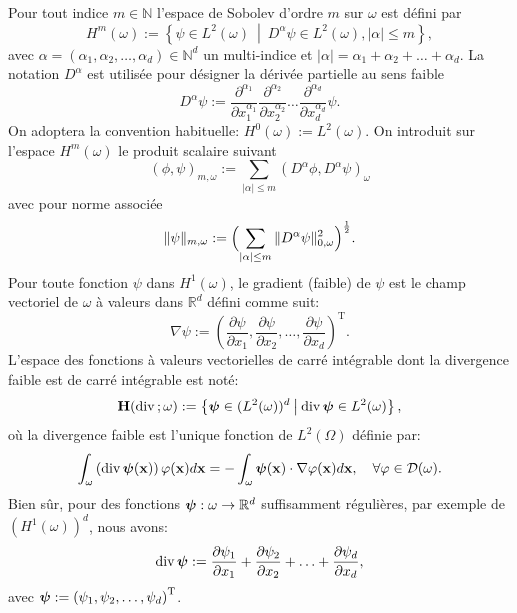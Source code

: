 \documentclass[11pt]{book}
\def\x{{\bf x}}
\def\H{{\bf H}}
\newcommand{\caD}{{\cal D}}
\newcommand{\R}{\mathbb{R}}
\newcommand{\N}{\mathbb{N}}
\newcommand{\bpsi}{\mbox{\boldmath{$\psi$}}}
\renewcommand{\div} {{\rm{div} \,}}
\begin{document}
\medskip

Pour tout indice $m \in \N$ l'espace de Sobolev d'ordre $m$ sur $\omega$ est défini par
\[ 
H^{m}(\omega) :=
\left \{ \psi \in L^2(\omega) \:\middle|\: D^\alpha \psi \in  L^2(\omega), \vert \alpha \vert \le m \right \},
\]
avec $\alpha=(\alpha_1,\alpha_2,\ldots,\alpha_d) \in \N^d$ un multi-indice et $\vert \alpha  \vert = \alpha_1 + \alpha_2 + \ldots + \alpha_d$.
La notation $D^\alpha $ est utilisée pour désigner la dérivée partielle au sens faible
\[
D^\alpha \psi := \frac{\partial^{\alpha_1}}{\partial x_1^{\alpha_1}} \frac{\partial^{\alpha_2}}{\partial x_2^{\alpha_2}} \ldots \frac{\partial^{\alpha_d}}{\partial x_d^{\alpha_d}} \psi.  
\]
On adoptera la convention habituelle: $H^0({\omega}):=L^2({\omega})$.
On introduit sur l'espace $H^{m}(\omega)$ le produit scalaire suivant
\[
(\phi , \psi )_{m,{\omega}} := \sum_{ \vert\alpha\vert \le m} ( D^\alpha \phi , D^\alpha \psi )_\omega
\]
avec pour norme associée
$$ \Vert \psi\Vert_{m,{\omega}} := \Bigl(\sum_{ \vert\alpha\vert\le m} \Vert D^\alpha \psi \Vert_{0,\omega}^2\Bigr)^{\frac12}.
$$
Pour toute fonction $\psi$ dans $H^1(\omega)$, le gradient (faible) de $\psi$ est le champ vectoriel de $\omega$ à valeurs dans $\R^d$ défini comme suit:
\[
\nabla \psi := \left ( \frac{\partial \psi}{\partial x_1} , \frac{\partial \psi}{\partial x_2} ,
\ldots , \frac{\partial \psi}{\partial x_d} \right )^\mathrm{T}.
\]
L'espace des fonctions à valeurs vectorielles de carré intégrable dont la divergence faible est de carré intégrable est noté:
\[
\H ( \div ; \omega ) := 
\left \{ \bpsi \in (L^2(\omega))^d \:\middle|\: \div \bpsi \in  L^2(\omega) \right \},
\]
où la divergence faible est l'unique fonction de $L^2(\Omega)$ définie par:
\[
\int_\omega \left ( \div \bpsi (\x) \right ) \varphi (\x) d\x 
=
- \int_\omega \bpsi ( \x) \cdot \nabla \varphi (\x) d\x, \quad \forall \varphi \in \caD(\omega). 
\]
Bien sûr, pour des fonctions $\bpsi : \omega \rightarrow \R^d$ suffisamment régulières, par exemple de $(H^1(\omega))^d$, nous avons:
\[
\div \bpsi := \frac{\partial \psi_1}{\partial x_1} + \frac{\partial \psi_2}{\partial x_2} +
\ldots + \frac{\partial \psi_d}{\partial x_d},
\]
avec $\bpsi := \left ( \psi_1 , \psi_2 ,
\ldots , \psi_d \right )^\mathrm{T}$.

\medskip
\end{document}
